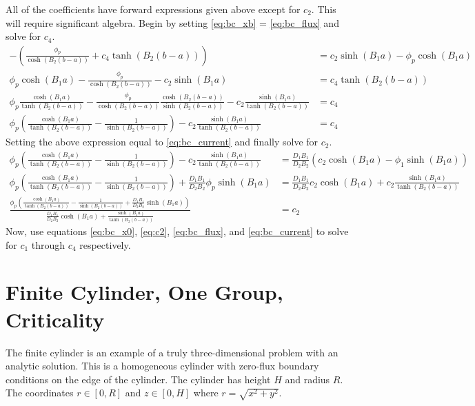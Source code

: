 \documentclass{article}
\begin{document}
  All of the coefficients have forward expressions given above except for 
  $c_2$. This will require significant algebra. Begin by setting 
  \eqref{eq:bc_xb} = \eqref{eq:bc_flux} and solve for $c_4$.
  \begin{align}
    - \left( \frac{\phi_p}{\cosh(B_2(b-a))} + c_4 \tanh(B_2 (b-a))\right)&=
      c_2 \sinh(B_1 a) - \phi_p \cosh(B_1 a) \\
    \phi_p \cosh(B_1 a) - \frac{\phi_p}{\cosh(B_2(b-a))} - 
      c_2 \sinh(B_1 a) &= c_4 \tanh(B_2 (b-a)) \\
    \phi_p \frac{\cosh(B_1 a)}{\tanh(B_2(b-a))} - 
      \frac{\phi_p}{\cosh(B_2(b-a))} 
      \frac{\cosh(B_2(b-a))}{\sinh(B_2(b-a))} - 
      c_2 \frac{\sinh(B_1 a)}{\tanh(B_2(b-a))} &= c_4\\
    \phi_p \left(\frac{\cosh(B_1 a)}{\tanh(B_2(b-a))} - \frac{1}
      {\sinh(B_2(b-a))} \right) - c_2 \frac{\sinh(B_1a)}{\tanh(B_2(b-a))} 
      &= c_4
  \end{align}
  Setting the above expression equal to \eqref{eq:bc_current} and finally 
  solve for $c_2$.
  \begin{align}
    \phi_p \left(\frac{\cosh(B_1 a)}{\tanh(B_2(b-a))} - 
      \frac{1}{\sinh(B_2(b-a))}\right) -
      c_2 \frac{\sinh(B_1 a)}{\tanh(B_2(b-a))} &=
      \frac{D_1 B_1}{D_2 B_2} \left( c_2 \cosh(B_1 a) - 
      \phi_1 \sinh(B_1 a)\right) \\
    \phi_p \left(\frac{\cosh(B_1 a)}{\tanh(B_2(b-a))} - 
      \frac{1}{\sinh(B_2(b-a))} \right) + 
      \frac{D_1 B_1}{D_2 B_2} \phi_p \sinh(B_1 a) &= 
      \frac{D_1 B_1}{D_2 B_2} c_2 \cosh(B_1a) + 
      c_2 \frac{\sinh(B_1a)}{\tanh(B_2(b-a))} \\
    \frac{\phi_p \left( \frac{\cosh(B_1a)}{\tanh(B_2(b-a))} - 
      \frac{1}{\sinh(B_2(b-a))} + 
      \frac{D_1 B_1}{D_2B_2} \sinh(B_1a) \right)}
      {\frac{D_1B_1}{D_2B_2} \cosh(B_1a) + 
      \frac{\sinh(B_1a)}{\tanh(B_2(b-a))}} &= c_2 \label{eq:c2}
  \end{align}
  Now, use equations \eqref{eq:bc_x0}, \eqref{eq:c2}, \eqref{eq:bc_flux}, and 
  \eqref{eq:bc_current} to solve for $c_1$ through $c_4$ respectively.
  
\section{Finite Cylinder, One Group, Criticality}
  The finite cylinder is an example of a truly three-dimensional problem with
  an analytic solution. This is a homogeneous cylinder with zero-flux boundary
  conditions on the edge of the cylinder. The cylinder has height $H$ and 
  radius $R$. The coordinates $r\in[0,R]$ and $z\in[0,H]$ where 
  $r=\sqrt{x^2+y^2}$.
  
\end{document}
